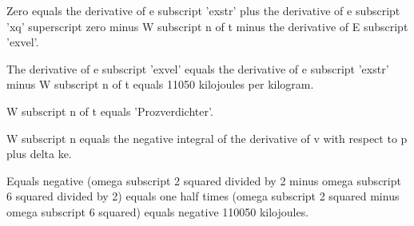 Zero equals the derivative of e subscript 'exstr' plus the derivative of e subscript 'xq' superscript zero minus W subscript n of t minus the derivative of E subscript 'exvel'.

The derivative of e subscript 'exvel' equals the derivative of e subscript 'exstr' minus W subscript n of t equals 11050 kilojoules per kilogram.

W subscript n of t equals 'Prozverdichter'.

W subscript n equals the negative integral of the derivative of v with respect to p plus delta ke.

Equals negative (omega subscript 2 squared divided by 2 minus omega subscript 6 squared divided by 2) equals one half times (omega subscript 2 squared minus omega subscript 6 squared) equals negative 110050 kilojoules.